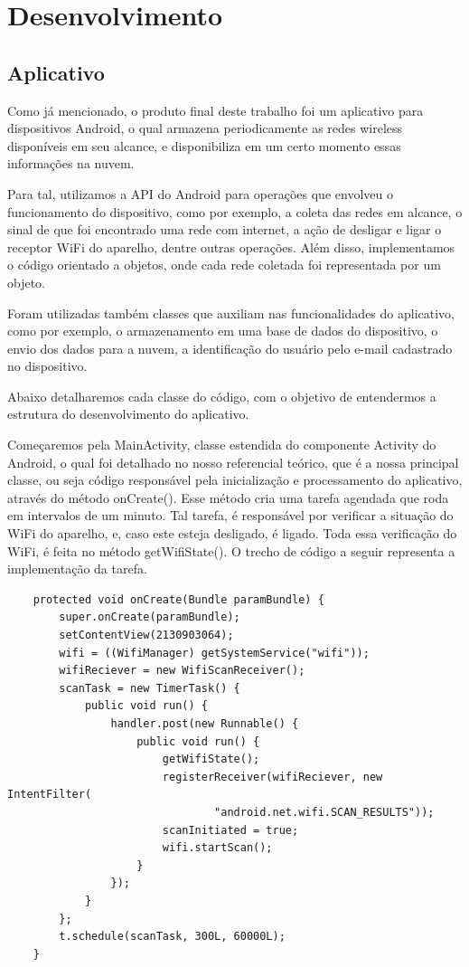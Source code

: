 \documentclass[12pt, %
openright, 
oneside,
a4paper,
brazil]{facom-ufu-abntex2}
\begin{document}
\chapter{Desenvolvimento}

\section{Aplicativo}
Como já mencionado, o produto final deste trabalho foi um aplicativo para dispositivos Android, o qual armazena periodicamente as redes wireless disponíveis em seu alcance, e disponibiliza em um certo momento essas informações na nuvem.

Para tal, utilizamos a \ac{API} do Android para operações que envolveu o funcionamento do dispositivo, como por exemplo, a coleta das redes em alcance, o sinal de que foi encontrado uma rede com internet, a ação de desligar e ligar o receptor \ac{WiFi} do aparelho, dentre outras operações. Além disso, implementamos o código orientado a objetos, onde cada rede coletada foi representada por um objeto.

Foram utilizadas também classes que auxiliam nas funcionalidades do aplicativo, como por exemplo, o armazenamento em uma base de dados do dispositivo, o envio dos dados para a nuvem, a identificação do usuário pelo e-mail cadastrado no dispositivo.

Abaixo detalharemos cada classe do código, com o objetivo de entendermos a estrutura do desenvolvimento do aplicativo.

Começaremos pela MainActivity, classe estendida do componente Activity do Android, o qual foi detalhado no nosso referencial teórico, que é a nossa principal classe, ou seja código responsável pela inicialização e processamento do aplicativo, através do método onCreate(). Esse método cria uma tarefa agendada que roda em intervalos de um minuto. Tal tarefa, é responsável por verificar a situação do \ac{WiFi} do aparelho, e, caso este esteja desligado, é ligado. Toda essa verificação do \ac{WiFi}, é feita no método getWifiState(). O trecho de código a seguir representa a implementação da tarefa.
\begin{lstlisting}
	protected void onCreate(Bundle paramBundle) {
		super.onCreate(paramBundle);
		setContentView(2130903064);
		wifi = ((WifiManager) getSystemService("wifi"));
		wifiReciever = new WifiScanReceiver();
		scanTask = new TimerTask() {
			public void run() {
				handler.post(new Runnable() {
					public void run() {
						getWifiState();
						registerReceiver(wifiReciever, new IntentFilter(
								"android.net.wifi.SCAN_RESULTS"));
						scanInitiated = true;
						wifi.startScan();
					}
				});
			}
		};
		t.schedule(scanTask, 300L, 60000L);
	}
\end{lstlisting}
\end{document}
